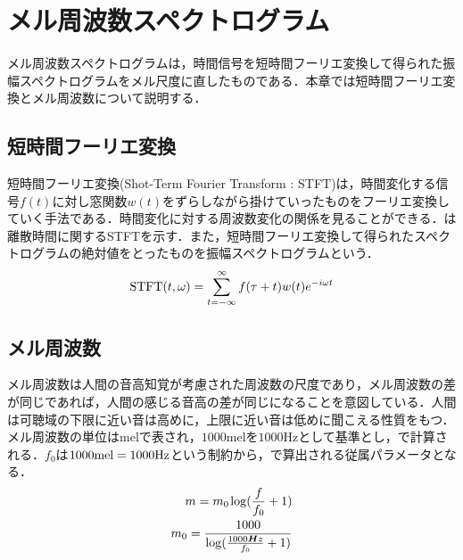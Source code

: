 \chapter{メル周波数スペクトログラム}
メル周波数スペクトログラムは，時間信号を短時間フーリエ変換して得られた振幅スペクトログラムをメル尺度に直したものである\cite{melspect}．本章では短時間フーリエ変換とメル周波数について説明する．

\section{短時間フーリエ変換}
短時間フーリエ変換(Shot-Term Fourier Transform : STFT)は，時間変化する信号$f(t)$に対し窓関数$w(t)$をずらしながら掛けていったものをフーリエ変換していく手法である．時間変化に対する周波数変化の関係を見ることができる．は離散時間に関するSTFTを示す．また，短時間フーリエ変換して得られたスペクトログラムの絶対値をとったものを振幅スペクトログラムという．
\begin{eqnarray}
	{\rm STFT}(t, \omega) = \sum_{t=-\infty}^{\infty} f(\tau + t)w(t)e^{-i\omega t} \label{eq:stft}
\end{eqnarray}

\section{メル周波数}
メル周波数は人間の音高知覚が考慮された周波数の尺度であり，メル周波数の差が同じであれば，人間の感じる音高の差が同じになることを意図している．人間は可聴域の下限に近い音は高めに，上限に近い音は低めに聞こえる性質をもつ．メル周波数の単位はmelで表され，$1000$melを$1000$Hzとして基準とし，で計算される．$f_0$は$1000 \rm mel = 1000 \rm Hz$という制約から，で算出される従属パラメータとなる．
\begin{eqnarray}
	m =  m_0 \hspace{1pt} {\rm log}(\frac{f}{f_0} + 1) \label{eq:mel} \\
	m_0 = \frac{1000}{{\rm log}(\frac{1000\bm Hz}{f_0} + 1)} \label{eq:f0}
\end{eqnarray}
